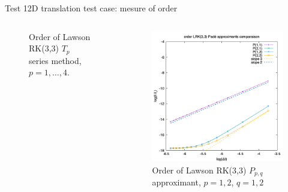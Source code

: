 \documentclass{beamer}
\begin{document}
\begin{frame}{Test 1}{2D translation test case: mesure of order}
{\begin{columns}
\begin{column}{0.5\textwidth}
\begin{figure}
          \caption{Order of Lawson RK(3,3) $T_p$ series method, $p=1,\dots,4$.}
        \end{figure}
      \end{column}
      \begin{column}{0.5\textwidth}
        \begin{figure}
          \centering
          \includegraphics[height=0.6\textheight]{img/order_lrk33pade}
          \caption{Order of Lawson RK(3,3) $P_{p,q}$ approximant, $p=1,2$, $q=1,2$}
        \end{figure}
      \end{column}
    \end{columns}
  }
\end{frame}
\end{document}
